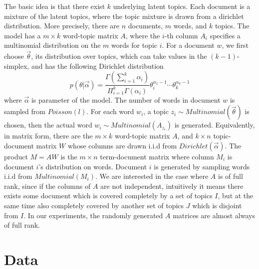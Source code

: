 \documentclass{sig-alternate}
\begin{document}
The basic idea is that there exist $k$ underlying latent topics. Each
document is a mixture of the latent topics, where the topic mixture is
drawn from a dirichlet distribution. More precisely, there are $n$
documents, $m$ words, and $k$ topics. The model has a $m\times k$
word-topic matrix $A$, where the $i$-th column $A_i$ specifies a
multinomial distribution on the $m$ words for topic $i$. For a
document $w$, we first choose $\vec{\theta}$, its distribution over
topics, which can take values in the $(k-1)$-simplex, and has the
following Dirichlet distribution
\[
p(\theta|\vec{\alpha})=\frac{\Gamma(\sum_{i=1}^k\alpha_i)}{\Pi_{i=1}^k\Gamma(\alpha_i)}\theta_i^{\alpha_1-1}\cdots\theta_k^{\alpha_k-1}
\] 
where $\vec{\alpha}$ is parameter of the model. The number of words in
document $w$ is sampled from $Poisson(l)$. For each word $w_i$, a
topic $z_i\sim Multinomial(\vec{\theta})$ is chosen, then the actual
word $w_i\sim Multinomial(A_{z_i})$ is generated. Equivalently, in
matrix form, there are the $m\times k$ word-topic matrix $A$, and
$k\times n$ topic-document matrix $W$ whose columns are drawn i.i.d
from $Dirichlet(\vec{\alpha})$. The product $M=AW$ is the $m\times n$
term-document matrix where column $M_i$ is document $i$'s distribution
on words. Document $i$ is generated by sampling words i.i.d from
$Multinomial(M_i)$. We are interested in the case where $A$ is of full
rank, since if the columns of $A$ are not independent, intuitively it
means there exists some document which is covered completely by a set
of topics $I$, but at the same time also completely covered by another
set of topics $J$ which is disjoint from $I$. In our experiments, the
randomly generated $A$ matrices are almost always of full rank.

\section{Data} \label{sec:data}
\end{document}
